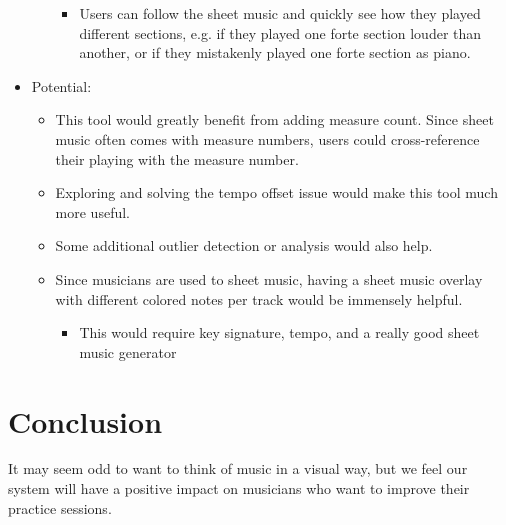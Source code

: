 \documentclass[journal]{vgtc}                %
\begin{document}
\begin{itemize}
\begin{itemize}
\begin{itemize}
      \item Users can follow the sheet music and quickly see how they played different sections, e.g. if they played one forte section louder than another, or if they mistakenly played one forte section as piano.
    \end{itemize}
  \end{itemize}
  \item Potential:
  \begin{itemize}
    \item This tool would greatly benefit from adding measure count. Since sheet music often comes with measure numbers, users could cross-reference their playing with the measure number.
    \item Exploring and solving the tempo offset issue would make this tool much more useful.
    \item Some additional outlier detection or analysis would also help.
    \item Since musicians are used to sheet music, having a sheet music overlay with different colored notes per track would be immensely helpful.
    \begin{itemize}
      \item This would require key signature, tempo, and a really good sheet music generator
    \end{itemize}
  \end{itemize}
\end{itemize}

\section{Conclusion}

It may seem odd to want to think of music in a visual way, but we feel our
system will have a positive impact on musicians who want to improve their
practice sessions.
\end{document}
